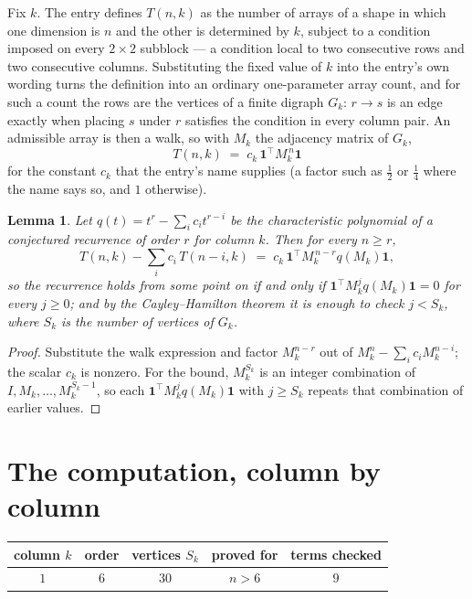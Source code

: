 \documentclass[11pt,a4paper]{article}
\theoremstyle{plain}
\newtheorem{lemma}[theorem]{Lemma}
\theoremstyle{definition}
\begin{document}
Fix $k$. The entry defines $T(n,k)$ as the number of arrays of a shape in which one dimension
is $n$ and the other is determined by $k$, subject to a condition imposed on every
$2\times2$ subblock --- a condition local to two consecutive rows and two consecutive columns.
Substituting the fixed value of $k$ into the entry's own wording turns the definition into an
ordinary one-parameter array count, and for such a count the rows are the vertices of a finite
digraph $G_k$: $r\to s$ is an edge exactly when placing $s$ under $r$ satisfies the condition
in every column pair. An admissible array is then a walk, so with $M_k$ the adjacency matrix
of $G_k$,
\[
T(n,k)\;=\;c_k\,\mathbf{1}^{\!\top}M_k^{\,n}\mathbf{1}
\]
for the constant $c_k$ that the entry's name supplies (a factor such as $\tfrac12$ or
$\tfrac14$ where the name says so, and $1$ otherwise).

\begin{lemma}\label{lem:crit}
Let $q(t)=t^{r}-\sum_i c_it^{r-i}$ be the characteristic polynomial of a conjectured
recurrence of order $r$ for column $k$. Then for every $n\ge r$,
\[
T(n,k)-\sum_i c_i\,T(n-i,k)\;=\;c_k\,\mathbf{1}^{\!\top}M_k^{\,n-r}q(M_k)\mathbf{1},
\]
so the recurrence holds from some point on if and only if
$\mathbf{1}^{\!\top}M_k^{j}q(M_k)\mathbf{1}=0$ for every $j\ge0$; and by the
Cayley--Hamilton theorem it is enough to check $j<S_k$, where $S_k$ is the number of vertices
of $G_k$.
\end{lemma}

\begin{proof}
Substitute the walk expression and factor $M_k^{n-r}$ out of $M_k^{n}-\sum_ic_iM_k^{n-i}$;
the scalar $c_k$ is nonzero. For the bound, $M_k^{S_k}$ is an integer combination of
$I,M_k,\dots,M_k^{S_k-1}$, so each $\mathbf{1}^{\!\top}M_k^{j}q(M_k)\mathbf{1}$ with
$j\ge S_k$ repeats that combination of earlier values.
\end{proof}

\section{The computation, column by column}

\begin{center}
\begin{tabular}{ccccc}
column $k$ & order & vertices $S_k$ & proved for & terms checked \\ \hline
$1$ & $6$ & $30$ & $n>6$ & $9$ \\
\end{tabular}
\end{center}
\end{document}
